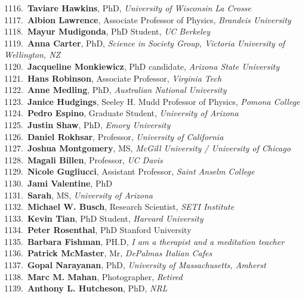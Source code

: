 1116.~{\bf Taviare Hawkins}, PhD, {\sl University of Wisconsin La Crosse} \\
1117.~{\bf Albion Lawrence}, Associate Professor of Physics, {\sl Brandeis University} \\
1118.~{\bf Mayur Mudigonda}, PhD Student, {\sl UC Berkeley} \\
1119.~{\bf Anna Carter}, PhD, {\sl Science in Society Group, Victoria University of Wellington, NZ} \\
1120.~{\bf Jacqueline Monkiewicz}, PhD candidate, {\sl Arizona State University} \\
1121.~{\bf Hans Robinson}, Associate Professor, {\sl Virginia Tech} \\
1122.~{\bf Anne Medling}, PhD, {\sl Australian National University} \\
1123.~{\bf Janice Hudgings}, Seeley H. Mudd Professor of Physics, {\sl Pomona College} \\
1124.~{\bf Pedro Espino}, Graduate Student, {\sl University of Arizona} \\
1125.~{\bf Justin Shaw}, PhD, {\sl Emory University} \\
1126.~{\bf Daniel Rokhsar}, Professor, {\sl University of California} \\
1127.~{\bf Joshua Montgomery}, MS, {\sl McGill University / University of Chicago} \\
1128.~{\bf Magali Billen}, Professor, {\sl UC Davis} \\
1129.~{\bf Nicole Gugliucci}, Assistant Professor, {\sl Saint Anselm College} \\
1130.~{\bf Jami Valentine}, PhD \\
1131.~{\bf Sarah}, MS, {\sl University of Arizona} \\
1132.~{\bf Michael W. Busch}, Research Scientist, {\sl SETI Institute} \\
1133.~{\bf Kevin Tian}, PhD Student, {\sl Harvard University} \\
1134.~{\bf Peter Rosenthal}, PhD Stanford University \\
1135.~{\bf Barbara Fishman}, PH.D, {\sl I am a therapist and a meditation teacher} \\
1136.~{\bf Patrick McMaster}, Mr, {\sl DePalmas Italian Cafes} \\
1137.~{\bf Gopal Narayanan}, PhD, {\sl University of Massachusetts, Amherst} \\
1138.~{\bf Marc M. Mahan}, Photographer, {\sl Retired} \\
1139.~{\bf Anthony L. Hutcheson}, PhD, {\sl NRL} \\
